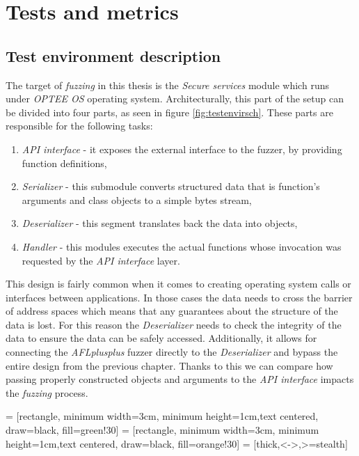 \cleardoublepage
\section{Tests and metrics} \label{chap:tests}

\subsection{Test environment description}

The target of \textit{fuzzing} in this thesis is the \textit{Secure services} module which runs under \textit{OPTEE OS} operating system. Architecturally, this part of the setup can be divided into four parts, as seen in figure \ref{fig:testenvirsch}. These parts are responsible for the following tasks:
\begin{enumerate}
    \item \textit{API interface} - it exposes the external interface to the fuzzer, by providing function definitions,
    \item \textit{Serializer} - this submodule converts structured data that is function's arguments and class objects to a simple bytes stream,
    \item \textit{Deserializer} - this segment translates back the data into objects,
    \item \textit{Handler} - this modules executes the actual functions whose invocation was requested by the \textit{API interface} layer.
\end{enumerate}
This design is fairly common when it comes to creating operating system calls or interfaces between applications. In those cases the data needs to cross the barrier of address spaces which means that any guarantees about the structure of the data is lost. For this reason the \textit{Deserializer} needs to check the integrity of the data to ensure the data can be safely accessed. Additionally, it allows for connecting the \textit{AFLplusplus} fuzzer directly to the \textit{Deserializer} and bypass the entire design from the previous chapter. Thanks to this we can compare how passing properly constructed objects and arguments to the \textit{API interface} impacts the \textit{fuzzing} process.

 = [rectangle, minimum width=3cm, minimum height=1cm,text centered, draw=black, fill=green!30]
 = [rectangle, minimum width=3cm, minimum height=1cm,text centered, draw=black, fill=orange!30]
 = [thick,<->,>=stealth]

